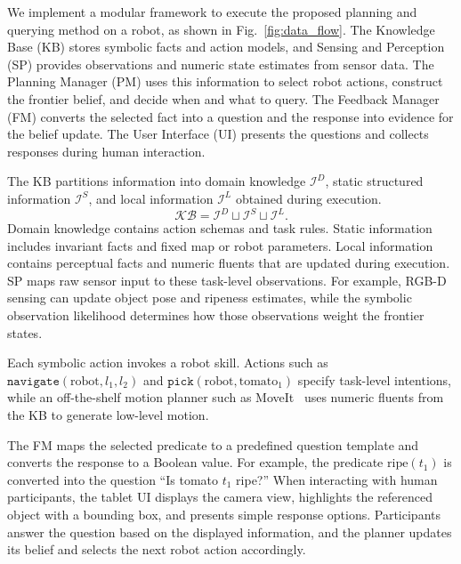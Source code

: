 We implement a modular framework to execute the proposed planning and querying method on a robot, as shown in Fig.~\ref{fig:data_flow}. The Knowledge Base (KB) stores symbolic facts and action models, and Sensing and Perception (SP) provides observations and numeric state estimates from sensor data. The Planning Manager (PM) uses this information to select robot actions, construct the frontier belief, and decide when and what to query. The Feedback Manager (FM) converts the selected fact into a question and the response into evidence for the belief update. The User Interface (UI) presents the questions and collects responses during human interaction.

\label{method:KB}
The KB partitions information into domain knowledge $\mathcal{I}^{D}$, static structured information $\mathcal{I}^{S}$, and local information $\mathcal{I}^{L}$ obtained during execution.
\[\mathcal{KB}=\mathcal{I}^{D}\sqcup\mathcal{I}^{S}\sqcup\mathcal{I}^{L}.\]
Domain knowledge contains action schemas and task rules. Static information includes invariant facts and fixed map or robot parameters. Local information contains perceptual facts and numeric fluents that are updated during execution. SP maps raw sensor input to these task-level observations. For example, RGB-D sensing can update object pose and ripeness estimates, while the symbolic observation likelihood determines how those observations weight the frontier states.

\label{method:action_execution}
Each symbolic action invokes a robot skill. Actions such as $\texttt{navigate}(\text{robot},l_1,l_2)$ and $\texttt{pick}(\text{robot},\text{tomato}_1)$ specify task-level intentions, while an off-the-shelf motion planner such as MoveIt~\cite{chitta2012moveit} uses numeric fluents from the KB to generate low-level motion.

\label{method:FM}
The FM maps the selected predicate to a predefined question template and converts the response to a Boolean value. For example, the predicate $\mathrm{ripe}(t_1)$ is converted into the question ``Is tomato $t_1$ ripe?'' When interacting with human participants, the tablet UI displays the camera view, highlights the referenced object with a bounding box, and presents simple response options. Participants answer the question based on the displayed information, and the planner updates its belief and selects the next robot action accordingly.